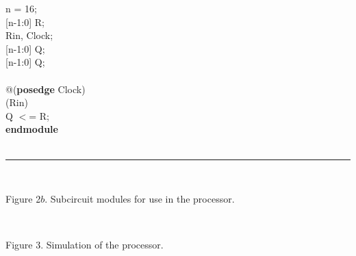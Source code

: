 \documentclass[epsfig,10pt,fullpage]{article}
\begin{document}
\begin{center}
\begin{minipage}[t]{12.5 cm}
\begin{tabbing}
 n = 16;\\
 [n-1:0] R;\\
 Rin, Clock;\\
 [n-1:0] Q;\\
 [n-1:0] Q;\\
~\\
 @({\bf posedge} Clock)\\
\> (Rin)\\
\>\>\>Q $<$= R;\\
{\bf endmodule}\\
~\rule{5.0in}{0in}\\
\end{tabbing}
\end{minipage}
\end{center}

\begin{center}
Figure 2$b$. Subcircuit modules for use in the processor.
\end{center}

~\\
\begin{figure}[H]
\scriptsize
\centerline{
\hbox{}}
\end{figure}
\centerline{Figure 3.  Simulation of the processor.}
\end{document}
